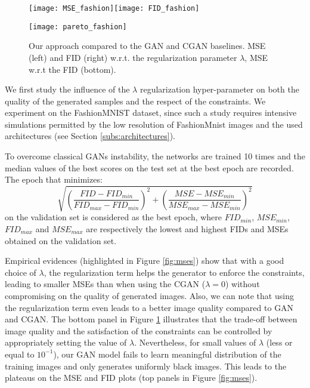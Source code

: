 \begin{figure}[t]
	\centering
	\texttt{[image: MSE\_fashion]}\texttt{[image: FID\_fashion]}
	
	\texttt{[image: pareto\_fashion]}
	
	\centering
	\caption[Comparison between our approach and the GAN/CGAN approach on FashionMNIST]{Our approach compared to the GAN and CGAN baselines. MSE (left) and  FID (right) w.r.t. the regularization parameter $\lambda$, MSE w.r.t the FID (bottom).
	}
	\label{fig:fids}
	\label{fig:mses}
	\label{fig:paretos}
\end{figure}

We first study the influence of the $\lambda$ regularization hyper-parameter on both the quality of the generated samples and the respect of the constraints. We experiment on the %
FashionMNIST \citep{Xiao2017} dataset, since such a study requires intensive simulations permitted by the low resolution of FashionMnist images and the used architectures (see Section \ref{subs:architectures}). 

To overcome classical GANs instability, the networks are trained 10 times and the median values of the best scores on the test set at the best epoch 
are recorded. The epoch that minimizes:
\begin{equation*}
\sqrt{\left(\frac{FID - FID_{min}}{FID_{max}- FID_{min}}\right)^2 + \left(\frac{MSE - MSE_{min}}{MSE_{max}- MSE_{min}}\right)^2}
\end{equation*}  on the validation set is considered as the best epoch, where $FID_{min}$, $MSE_{min}$, $FID_{max}$ and $MSE_{max}$ are respectively the lowest and highest FIDs and MSEs obtained on the validation set.

Empirical evidences (highlighted in Figure \ref{fig:mses}) show that with a good choice of $\lambda$, the regularization term helps the generator to enforce the constraints, leading to smaller MSEs than when using the CGAN ($\lambda=0$) without compromising on the quality of generated images. Also, we can note that using the regularization term even leads to a better image quality compared to GAN and CGAN.
%
The bottom panel in Figure \ref{fig:paretos} illustrates that the trade-off between image quality and the satisfaction of the constraints can be controlled by appropriately setting the value of $\lambda$. Nevertheless, for small values of $\lambda$ (less or equal to $10^{-1}$), our GAN model fails to learn meaningful distribution of the training images and only generates uniformly black images. This leads to the plateaus on the MSE and FID plots (top panels in Figure \ref{fig:mses}).



